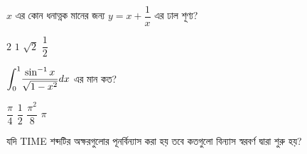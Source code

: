 \documentclass[addpoints]{exam}
\begin{document}
\begin{questions}
\begin{oneparchoices}
 \choice {}
 
\end{oneparchoices}

\question $ x $ এর কোন ধনাত্নক মানের জন্য $ y=x+\dfrac{1}{x} $ এর ঢাল শূণ্য?

\begin{oneparchoices}
\choice  $ 2 $
\choice  $ 1 $
\choice  $ \sqrt{2} $
\choice  $ \dfrac{1}{2} $
\end{oneparchoices}

\question $ \mathlarger{\int_{0}^{1}}\dfrac{\sin^{-1}x}{\sqrt{1-x^{2}}}dx  $ এর মান কত?

\begin{oneparchoices}
\choice $ \dfrac{\pi}{4} $
\choice $ \dfrac{1}{2} $
\choice $ \dfrac{\pi^{2}}{8} $
\choice  $ \pi $
\end{oneparchoices}

 \question যদি TIME শব্দটির অক্ষরগুলোর পূনর্বিন্যাস করা হয় তবে কতগুলো বিন্যাস স্বরবর্ণ দ্বারা শুরু হয়?

\begin{oneparchoices}
\end{oneparchoices}

\end{questions}
\end{document}
